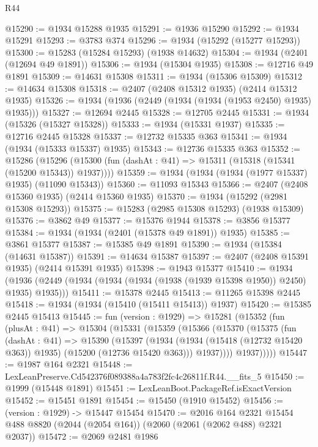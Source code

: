\begin{lexlean}{R44}
\begin{coremodule}
@15290 := @1934 @15288 @1935
@15291 := @1936 @15290
@15292 := @1934 @15291
@15293 := @3783 @374
@15296 := @1934 (@15292 (@15277 @15293))
@15300 := @15283 (@15284 @15293) (@1938 @14632)
@15304 := @1934 (@2401 (@12694 @49 @1891))
@15306 := @1934 (@15304 @1935)
@15308 := @12716 @49 @1891
@15309 := @14631 @15308
@15311 := @1934 (@15306 @15309)
@15312 := @14634 @15308
@15318 := @2407 (@2408 @15312 @1935) (@2414 @15312 @1935)
@15326 := @1934 (@1936 (@2449 (@1934 (@1934 (@1953 @2450) @1935) @1935)))
@15327 := @12694 @2445
@15328 := @12705 @2445
@15331 := @1934 (@15326 (@15327 @15328))
@15333 := @1934 (@15331 @1937)
@15335 := @12716 @2445 @15328
@15337 := @12732 @15335 @363
@15341 := @1934 (@1934 (@15333 @15337) @1935)
@15343 := @12736 @15335 @363
@15352 := @15286
    (@15296 (@15300 (fun (dashAt : @41) => @15311 (@15318 (@15341 (@15200 @15343)) @1937))))
@15359 := @1934 (@1934 (@1934 (@1977 @15337) @1935) (@11090 @15343))
@15360 := @11093 @15343
@15366 := @2407 (@2408 @15360 @1935) (@2414 @15360 @1935)
@15370 := @1934 (@15292 (@2981 @15308 @15293))
@15375 := @15283 (@2985 @15308 @15293) (@1938 @15309)
@15376 := @3862 @49
@15377 := @15376 @1944
@15378 := @3856 @15377
@15384 := @1934 (@1934 (@2401 (@15378 @49 @1891)) @1935)
@15385 := @3861 @15377
@15387 := @15385 @49 @1891
@15390 := @1934 (@15384 (@14631 @15387))
@15391 := @14634 @15387
@15397 := @2407 (@2408 @15391 @1935) (@2414 @15391 @1935)
@15398 := @1943 @15377
@15410 := @1934
    (@1936 (@2449 (@1934 (@1934 (@1934 (@1938 (@1939 @15398 @1950)) @2450) @1935) @1935)))
@15411 := @15378 @2445
@15413 := @11265 @15398 @2445
@15418 := @1934 (@1934 (@15410 (@15411 @15413)) @1937)
@15420 := @15385 @2445 @15413
@15445 := fun (version : @1929) =>
  @15281
    (@15352
      (fun (plusAt : @41) =>
      @15304
        (@15331
          (@15359
            (@15366
              (@15370
                (@15375
                  (fun (dashAt : @41) =>
                  @15390
                    (@15397
                      (@1934
                        (@1934 (@15418 (@12732 @15420 @363)) @1935)
                        (@15200 (@12736 @15420 @363)))
                      @1937))))
              @1937)))))
@15447 := @1987 @164 @2321
@15448 := LexLeanPreserve.Cd542376f089388a4a783f2fc4c26811f.R44.__fits_5
@15450 := @1999 (@15448 @1891)
@15451 := LexLeanBoot.PackageRef.isExactVersion
@15452 := @15451 @1891
@15454 := @15450 (@1910 @15452)
@15456 := (version : @1929) -> @15447 @15454
@15470 := @2016
    @164
    @2321
    @15454
    @488
    @8820
    (@2044 (@2054 @164))
    (@2060 (@2061 (@2062 @488) @2321 @2037))
@15472 := @2069 @2481 @1986

\end{coremodule}
\end{lexlean}
